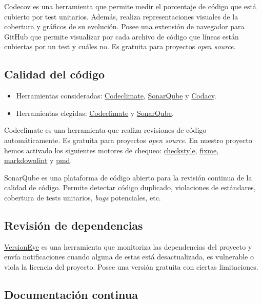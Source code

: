 Codecov es una herramienta que permite medir el porcentaje de código que
está cubierto por test unitarios. Además, realiza representaciones visuales de
la cobertura y gráficos de su evolución. Posee una extensión de
navegador para GitHub que permite visualizar por cada archivo de código
que líneas están cubiertas por un test y cuáles no. Es gratuita para
proyectos \emph{open source}.

\subsection{Calidad del código}\label{calidad-del-codigo}

\begin{itemize}
\tightlist
\item
  Herramientas consideradas:
  \href{https://codeclimate.com/}{Codeclimate},
  \href{https://sonarqube.com/}{SonarQube} y
  \href{https://www.codacy.com/}{Codacy}.
\item
  Herramientas elegidas: \href{https://codeclimate.com/}{Codeclimate} y
  \href{https://sonarqube.com/}{SonarQube}.
\end{itemize}

Codeclimate es una herramienta que realiza revisiones de código
automáticamente. Es gratuita para proyectos \emph{open source}. En
nuestro proyecto hemos activado los siguientes motores de chequeo:
\href{https://docs.codeclimate.com/docs/checkstyle}{checkstyle},
\href{https://docs.codeclimate.com/docs/fixme}{fixme},
\href{https://docs.codeclimate.com/docs/markdownlint}{markdownlint} y
\href{https://docs.codeclimate.com/docs/pmd}{pmd}.

SonarQube es una plataforma de código abierto para la revisión continua
de la calidad de código. Permite detectar código duplicado, violaciones
de estándares, cobertura de tests unitarios, \emph{bugs} potenciales,
etc.

\subsection{Revisión de dependencias}\label{revision-de-dependencias}

\href{https://www.versioneye.com/}{VersionEye} es una herramienta que monitoriza las dependencias del
proyecto y envía notificaciones cuando alguna de estas está
desactualizada, es vulnerable o viola la licencia del proyecto. Posee
una versión gratuita con ciertas limitaciones.

\subsection{Documentación continua}\label{documentacion-continua}

